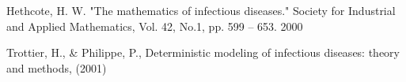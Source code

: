 \begin{thebibliography}{99}

Hethcote, H. W. "The mathematics of infectious diseases." Society for Industrial and Applied Mathematics, Vol. 42, No.1, pp. 599 – 653. 2000

Trottier, H., & Philippe, P., Deterministic modeling of infectious diseases: theory and methods, (2001)

\end{thebibliography}


